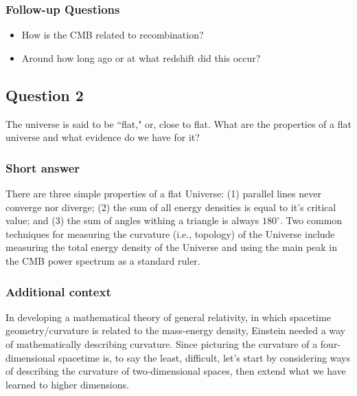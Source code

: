 \documentclass[a4paper,11pt]{article}
\begin{document}
\subsubsection{Follow-up Questions}

\begin{itemize}
    \item How is the CMB related to recombination?
    \item Around how long ago or at what redshift did this occur?
\end{itemize}

%
%

\newpage
\subsection{Question 2}

The universe is said to be ``flat," or, close to flat. What are the properties of a flat universe and what evidence do we have for it?

\subsubsection{Short answer}

There are three simple properties of a flat Universe: (1) parallel lines never converge nor diverge; (2) the sum of all energy densities is equal to it's critical value; and (3) the sum of angles withing a triangle is always $180^\circ$. Two common techniques for measuring the curvature (i.e., topology) of the Universe include measuring the total energy density of the Universe and using the main peak in the CMB power spectrum as a standard ruler.

\subsubsection{Additional context}

In developing a mathematical theory of general relativity, in which spacetime geometry/curvature is related to the mass-energy density, Einstein needed a way of mathematically describing curvature. Since picturing the curvature of a four-dimensional spacetime is, to say the least, difficult, let's start by considering ways of describing the curvature of two-dimensional spaces, then extend what we have learned to higher dimensions.
\end{document}
